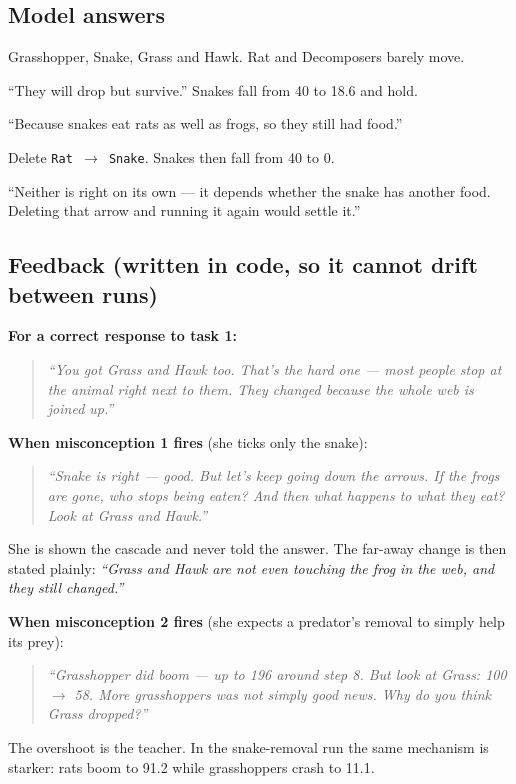 \documentclass[11pt,a4paper]{article}
\begin{document}
\subsection*{Model answers}

\begin{description}[leftmargin=1.2cm,style=nextline,itemsep=2pt]
  \item[Task 1] Grasshopper, Snake, Grass and Hawk. Rat and Decomposers barely move.
  \item[Task 2] ``They will drop but survive.'' Snakes fall from 40 to 18.6 and hold.
  \item[Task 3] ``Because snakes eat rats as well as frogs, so they still had food.''
  \item[Task 4] Delete \texttt{Rat $\rightarrow$ Snake}. Snakes then fall from 40 to 0.
  \item[Task 5] ``Neither is right on its own --- it depends whether the snake has another food.
        Deleting that arrow and running it again would settle it.''
\end{description}

\subsection*{Feedback (written in code, so it cannot drift between runs)}

\textbf{For a correct response to task 1:}
\begin{quote}\itshape
``You got Grass and Hawk too. That's the hard one --- most people stop at the animal right next
to them. They changed because the whole web is joined up.''
\end{quote}

\textbf{When misconception 1 fires} (she ticks only the snake):
\begin{quote}\itshape
``Snake is right --- good. But let's keep going down the arrows. If the frogs are gone, who stops
being eaten? And then what happens to what they eat? Look at Grass and Hawk.''
\end{quote}
She is shown the cascade and never told the answer. The far-away change is then stated plainly:
\textit{``Grass and Hawk are not even touching the frog in the web, and they still changed.''}

\textbf{When misconception 2 fires} (she expects a predator's removal to simply help its prey):
\begin{quote}\itshape
``Grasshopper did boom --- up to 196 around step 8. But look at Grass: 100 $\rightarrow$ 58. More
grasshoppers was not simply good news. Why do you think Grass dropped?''
\end{quote}
The overshoot is the teacher. In the snake-removal run the same mechanism is starker: rats boom
to 91.2 while grasshoppers crash to 11.1.
\end{document}
